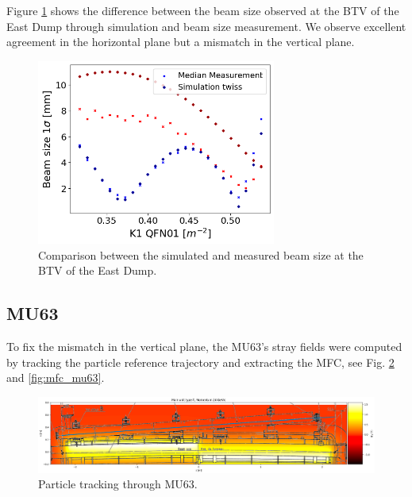 Figure \ref{fig:comparison_sim_meas} shows the difference between the beam size observed at the BTV of the East Dump through simulation and beam size measurement. We observe excellent agreement in the horizontal plane but a mismatch in the vertical plane.

\begin{figure}[H]
\centering
\includegraphics[width=0.7\textwidth]{02_Simulation/images/comparison_sim_meas.png}
\caption{Comparison between the simulated and measured beam size at the BTV of the East Dump.}
\label{fig:comparison_sim_meas}
\end{figure}




\subsection{MU63}

To fix the mismatch in the vertical plane, the MU63's stray fields were computed by tracking the particle reference trajectory and extracting the MFC, see Fig. \ref{fig:track_mu63} and \ref{fig:mfc_mu63}.

\begin{figure}[H]
\centering
\includegraphics[width=1.0\textwidth]{02_Simulation/images/track_mu63.png}
\caption{Particle tracking through MU63.}
\label{fig:track_mu63}
\end{figure}


